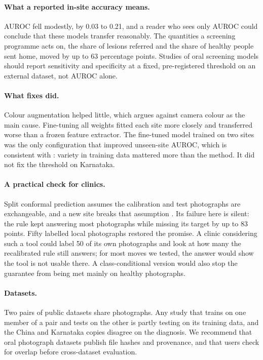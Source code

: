 \documentclass[11pt]{article}
\begin{document}
\paragraph{What a reported in-site accuracy means.} AUROC fell modestly, by 0.03 to 0.21, and a reader who sees only AUROC could conclude that these models transfer reasonably. The quantities a screening programme acts on, the share of lesions referred and the share of healthy people sent home, moved by up to 63 percentage points. Studies of oral screening models should report sensitivity and specificity at a fixed, pre-registered threshold on an external dataset, not AUROC alone.

\paragraph{What fixes did.} Colour augmentation helped little, which argues against camera colour as the main cause. Fine-tuning all weights fitted each site more closely and transferred worse than a frozen feature extractor. The fine-tuned model trained on two sites was the only configuration that improved unseen-site AUROC, which is consistent with \citet{gulrajani2021lost}: variety in training data mattered more than the method. It did not fix the threshold on Karnataka.

\paragraph{A practical check for clinics.} Split conformal prediction assumes the calibration and test photographs are exchangeable, and a new site breaks that assumption \citep{tibshirani2019covariate}. Its failure here is silent: the rule kept answering most photographs while missing its target by up to 83 points. Fifty labelled local photographs restored the promise. A clinic considering such a tool could label 50 of its own photographs and look at how many the recalibrated rule still answers; for most moves we tested, the answer would show the tool is not usable there. A class-conditional version \citep{sadinle2019least} would also stop the guarantee from being met mainly on healthy photographs.

\paragraph{Datasets.} Two pairs of public datasets share photographs. Any study that trains on one member of a pair and tests on the other is partly testing on its training data, and the China and Karnataka copies disagree on the diagnosis. We recommend that oral photograph datasets publish file hashes and provenance, and that users check for overlap before cross-dataset evaluation.
\end{document}
